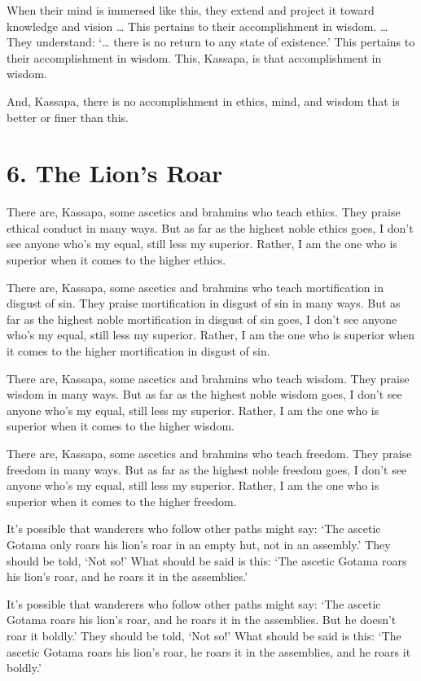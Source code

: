 \documentclass[12pt,openany]{book}%
\begin{document}
When their mind is immersed like this, they extend and project it toward knowledge and vision … This pertains to their accomplishment in wisdom. … They understand: ‘… there is no return to any state of existence.’ This pertains to their accomplishment in wisdom. This, Kassapa, is that accomplishment in wisdom. 

And, Kassapa, there is no accomplishment in ethics, mind, and wisdom that is better or finer than this. 

\section*{6. The Lion’s Roar }

There are, Kassapa, some ascetics and brahmins who teach ethics. They praise ethical conduct in many ways. But as far as the highest noble ethics goes, I don’t see anyone who’s my equal, still less my superior. Rather, I am the one who is superior when it comes to the higher ethics. 

There are, Kassapa, some ascetics and brahmins who teach mortification in disgust of sin. They praise mortification in disgust of sin in many ways. But as far as the highest noble mortification in disgust of sin goes, I don’t see anyone who’s my equal, still less my superior. Rather, I am the one who is superior when it comes to the higher mortification in disgust of sin. 

There are, Kassapa, some ascetics and brahmins who teach wisdom. They praise wisdom in many ways. But as far as the highest noble wisdom goes, I don’t see anyone who’s my equal, still less my superior. Rather, I am the one who is superior when it comes to the higher wisdom. 

There are, Kassapa, some ascetics and brahmins who teach freedom. They praise freedom in many ways. But as far as the highest noble freedom goes, I don’t see anyone who’s my equal, still less my superior. Rather, I am the one who is superior when it comes to the higher freedom. 

It’s possible that wanderers who follow other paths might say: ‘The ascetic Gotama only roars his lion’s roar in an empty hut, not in an assembly.’ They should be told, ‘Not so!’ What should be said is this: ‘The ascetic Gotama roars his lion’s roar, and he roars it in the assemblies.’ 

It’s possible that wanderers who follow other paths might say: ‘The ascetic Gotama roars his lion’s roar, and he roars it in the assemblies. But he doesn’t roar it boldly.’ They should be told, ‘Not so!’ What should be said is this: ‘The ascetic Gotama roars his lion’s roar, he roars it in the assemblies, and he roars it boldly.’ 
\end{document}
